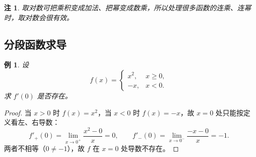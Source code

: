 \documentclass[UTF8,11pt]{ctexart}
\theoremstyle{cnthm}
\newtheorem{rem}[thm]{注}
\newtheorem{exa}[thm]{例}
\begin{document}
\begin{rem}
取对数可把乘积变成加法、把幂变成数乘，所以处理很多函数的连乘、连幂时，取对数会很有效。
\end{rem}

\subsection{分段函数求导}

\begin{exa}
设
\[
f(x)=\begin{cases}
x^{2}, & x\geq0,\\
-x, & x<0.
\end{cases}
\]
求 $f'(0)$ 是否存在。
\end{exa}

\begin{proof}
当 $x>0$ 时 $f(x)=x^2$，当 $x<0$ 时 $f(x)=-x$，故 $x=0$ 处只能按定义看左、右导数：
\[
f'_+(0)=\lim_{x\to0^+}\frac{x^{2}-0}{x}=0,
\qquad
f'_-(0)=\lim_{x\to0^-}\frac{-x-0}{x}=-1.
\]
两者不相等（$0\neq-1$），故 $f$ 在 $x=0$ 处导数不存在。
\end{proof}
\end{document}
